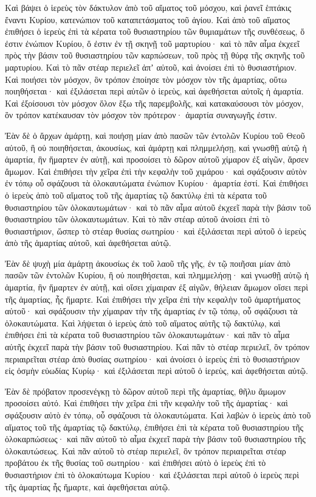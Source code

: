 {Καὶ βάψει ὁ ἱερεὺς τὸν δάκτυλον ἀπὸ τοῦ αἵματος τοῦ μόσχου, καὶ ῥανεῖ ἑπτάκις ἔναντι Κυρίου, κατενώπιον τοῦ καταπετάσματος τοῦ ἁγίου.
Καὶ ἀπὸ τοῦ αἵματος ἐπιθήσει ὁ ἱερεὺς ἐπὶ τὰ κέρατα τοῦ θυσιαστηρίου τῶν θυμιαμάτων τῆς συνθέσεως, ὅ ἐστιν ἐνώπιον Κυρίου, ὅ ἐστιν ἐν τῇ σκηνῇ τοῦ μαρτυρίου· καὶ τὸ πᾶν αἷμα ἐκχεεῖ πρὸς τὴν βάσιν τοῦ θυσιαστηρίου τῶν καρπώσεων, τοῦ πρὸς τῇ θύρᾳ τῆς σκηνῆς τοῦ μαρτυρίου.
Καὶ τὸ πᾶν στέαρ περιελεῖ ἀπʼ αὐτοῦ, καὶ ἀνοίσει ἐπὶ τὸ θυσιαστήριον.
Καὶ ποιήσει τὸν μόσχον, ὃν τρόπον ἐποίησε τὸν μόσχον τὸν τῆς ἁμαρτίας, οὕτω ποιηθήσεται· καὶ ἐξιλάσεται περὶ αὐτῶν ὁ ἱερεὺς, καὶ ἀφεθήσεται αὐτοῖς ἡ ἁμαρτία.
Καὶ ἐξοίσουσι τὸν μόσχον ὅλον ἔξω τῆς παρεμβολῆς, καὶ κατακαύσουσι τὸν μόσχον, ὃν τρόπον κατέκαυσαν τὸν μόσχον τὸν πρότερον· ἁμαρτία συναγωγῆς ἐστιν.
\par }{\PP {}Ἐὰν δὲ ὁ ἄρχων ἁμάρτῃ, καὶ ποιήσῃ μίαν ἀπὸ πασῶν τῶν ἐντολῶν Κυρίου τοῦ Θεοῦ αὐτοῦ, ἣ οὐ ποιηθήσεται, ἀκουσίως, καὶ ἁμάρτῃ καὶ πλημμελήσῃ,
καὶ γνωσθῇ αὐτῷ ἡ ἁμαρτία, ἣν ἥμαρτεν ἐν αὐτῇ, καὶ προσοίσει τὸ δῶρον αὐτοῦ χίμαρον ἐξ αἰγῶν, ἄρσεν ἄμωμον.
Καὶ ἐπιθήσει τὴν χεῖρα ἐπὶ τὴν κεφαλὴν τοῦ χιμάρου· καὶ σφάξουσιν αὐτὸν ἐν τόπῳ οὗ σφάζουσι τὰ ὁλοκαυτώματα ἐνώπιον Κυρίου· ἁμαρτία ἐστί.
Καὶ ἐπιθήσει ὁ ἱερεὺς ἀπὸ τοῦ αἵματος τοῦ τῆς ἁμαρτίας τῷ δακτύλῳ ἐπὶ τὰ κέρατα τοῦ θυσιαστηρίου τῶν ὁλοκαυτωμάτων· καὶ τὸ πᾶν αἷμα αὐτοῦ ἐκχεεῖ παρὰ τὴν βάσιν τοῦ θυσιαστηρίου τῶν ὁλοκαυτωμάτων.
Καὶ τὸ πᾶν στέαρ αὐτοῦ ἀνοίσει ἐπὶ τὸ θυσιαστήριον, ὥσπερ τὸ στέαρ θυσίας σωτηρίου· καὶ ἐξιλάσεται περὶ αὐτοῦ ὁ ἱερεὺς ἀπὸ τῆς ἁμαρτίας αὐτοῦ, καὶ ἀφεθήσεται αὐτῷ.
\par }{\PP {}Ἐὰν δὲ ψυχὴ μία ἁμάρτῃ ἀκουσίως ἐκ τοῦ λαοῦ τῆς γῆς, ἐν τῷ ποιῆσαι μίαν ἀπὸ πασῶν τῶν ἐντολῶν Κυρίου, ἣ οὐ ποιηθήσεται, καὶ πλημμελήσῃ·
καὶ γνωσθῇ αὐτῷ ἡ ἁμαρτία, ἣν ἥμαρτεν ἐν αὐτῇ, καὶ οἴσει χίμαιραν ἐξ αἰγῶν, θήλειαν ἄμωμον οἴσει περὶ τῆς ἁμαρτίας, ἧς ἥμαρτε.
Καὶ ἐπιθήσει τὴν χεῖρα ἐπὶ τὴν κεφαλὴν τοῦ ἁμαρτήματος αὐτοῦ· καὶ σφάξουσιν τὴν χίμαιραν τὴν τῆς ἁμαρτίας ἐν τῷ τόπῳ, οὗ σφάζουσι τὰ ὁλοκαυτώματα.
Καὶ λήψεται ὁ ἱερεὺς ἀπὸ τοῦ αἵματος αὐτῆς τῷ δακτύλῳ, καὶ ἐπιθήσει ἐπὶ τὰ κέρατα τοῦ θυσιαστηρίου τῶν ὁλοκαυτωμάτων· καὶ πᾶν τὸ αἷμα αὐτῆς ἐκχεεῖ παρὰ τὴν βάσιν τοῦ θυσιαστηρίου.
Καὶ πᾶν τὸ στέαρ περιελεῖ, ὃν τρόπον περιαιρεῖται στέαρ ἀπὸ θυσίας σωτηρίου· καὶ ἀνοίσει ὁ ἱερεὺς ἐπὶ τὸ θυσιαστήριον εἰς ὀσμὴν εὐωδίας Κυρίῳ· καὶ ἐξιλάσεται περὶ αὐτοῦ ὁ ἱερεὺς, καὶ ἀφεθήσεται αὐτῷ.
\par }{\PP {}Ἐὰν δὲ πρόβατον προσενέγκῃ τὸ δῶρον αὐτοῦ περὶ τῆς ἁμαρτίας, θῆλυ ἄμωμον προσοίσει αὐτό.
Καὶ ἐπιθήσει τὴν χεῖρα ἐπὶ τῆν κεφαλὴν τοῦ τῆς ἁμαρτίας· καὶ σφάξουσιν αὐτὸ ἐν τόπῳ, οὗ σφάζουσι τὰ ὁλοκαυτώματα.
Καὶ λαβὼν ὁ ἱερεὺς ἀπὸ τοῦ αἵματος τοῦ τῆς ἁμαρτίας τῷ δακτύλῳ, ἐπιθήσει ἐπὶ τὰ κέρατα τοῦ θυσιαστηρίου τῆς ὁλοκαρπώσεως· καὶ πᾶν αὐτοῦ τὸ αἷμα ἐκχεεῖ παρὰ τὴν βάσιν τοῦ θυσιαστηρίου τῆς ὁλοκαυτώσεως.
Καὶ πᾶν αὐτοῦ τὸ στέαρ περιελεῖ, ὃν τρόπον περιαιρεῖται στέαρ προβάτου ἐκ τῆς θυσίας τοῦ σωτηρίου· καὶ ἐπιθήσει αὐτὸ ὁ ἱερεὺς ἐπὶ τὸ θυσιαστήριον ἐπὶ τὸ ὁλοκαύτωμα Κυρίου· καὶ ἐξιλάσεται περὶ αὐτοῦ ὁ ἱερεὺς περὶ τῆς ἁμαρτίας ἧς ἥμαρτε, καὶ ἀφεθήσεται αὐτῷ.

}
